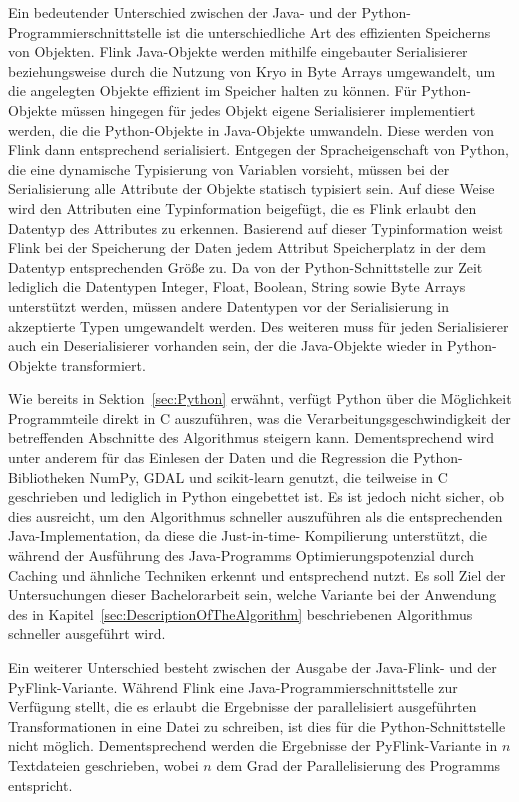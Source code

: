Ein bedeutender Unterschied zwischen der Java- und der Python-Programmierschnittstelle ist die unterschiedliche Art des effizienten Speicherns von Objekten. Flink Java-Objekte werden mithilfe eingebauter Serialisierer beziehungsweise durch die Nutzung von Kryo in Byte Arrays umgewandelt, um die angelegten Objekte effizient im Speicher halten zu können. Für Python-Objekte müssen hingegen für jedes Objekt eigene Serialisierer implementiert werden, die die Python-Objekte in Java-Objekte umwandeln. Diese werden von Flink dann entsprechend serialisiert. Entgegen der Spracheigenschaft von Python, die eine dynamische Typisierung von Variablen vorsieht, müssen bei der Serialisierung alle Attribute der Objekte statisch typisiert sein. Auf diese Weise wird den Attributen eine Typinformation beigefügt, die es Flink erlaubt den Datentyp des Attributes zu erkennen. Basierend auf dieser Typinformation weist Flink bei der Speicherung der Daten jedem Attribut Speicherplatz in der dem Datentyp entsprechenden Größe zu. Da von der Python-Schnittstelle zur Zeit lediglich die Datentypen Integer, Float, Boolean, String sowie Byte Arrays unterstützt werden, müssen andere Datentypen vor der Serialisierung in akzeptierte Typen umgewandelt werden. Des weiteren muss für jeden Serialisierer auch ein Deserialisierer vorhanden sein, der die Java-Objekte wieder in Python-Objekte transformiert. 

Wie bereits in Sektion~\ref{sec:Python} erwähnt, verfügt Python über die Möglichkeit Programmteile direkt in C auszuführen, was die Verarbeitungsgeschwindigkeit der betreffenden Abschnitte des Algorithmus steigern kann. Dementsprechend wird unter anderem für das Einlesen der Daten und die Regression die Python-Bibliotheken NumPy, GDAL und scikit-learn genutzt, die teilweise in C geschrieben und lediglich in Python eingebettet ist. Es ist jedoch nicht sicher, ob dies ausreicht, um den Algorithmus schneller auszuführen als die entsprechenden Java-Implementation, da diese die Just-in-time- Kompilierung unterstützt, die während der Ausführung des Java-Programms Optimierungspotenzial durch Caching und ähnliche Techniken erkennt und entsprechend nutzt. Es soll Ziel der Untersuchungen dieser Bachelorarbeit sein, welche Variante bei der Anwendung des in Kapitel~\ref{sec:DescriptionOfTheAlgorithm} beschriebenen Algorithmus schneller ausgeführt wird.

Ein weiterer Unterschied besteht zwischen der Ausgabe der Java-Flink- und der PyFlink-Variante. Während Flink eine Java-Programmierschnittstelle zur Verfügung stellt, die es erlaubt die Ergebnisse der parallelisiert ausgeführten Transformationen in eine Datei zu schreiben, ist dies für die Python-Schnittstelle nicht möglich. Dementsprechend werden die Ergebnisse der PyFlink-Variante in $n$ Textdateien geschrieben, wobei $n$ dem Grad der Parallelisierung des Programms entspricht.

